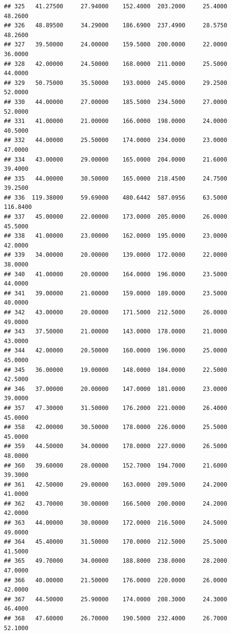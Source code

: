 \documentclass[]{article}
\begin{document}
\begin{verbatim}
## 325   41.27500     27.94000    152.4000  203.2000     25.4000       48.2600
## 326   48.89500     34.29000    186.6900  237.4900     28.5750       48.2600
## 327   39.50000     24.00000    159.5000  200.0000     22.0000       36.0000
## 328   42.00000     24.50000    168.0000  211.0000     25.5000       44.0000
## 329   50.75000     35.50000    193.0000  245.0000     29.2500       52.0000
## 330   44.00000     27.00000    185.5000  234.5000     27.0000       52.0000
## 331   41.00000     21.00000    166.0000  198.0000     24.0000       40.5000
## 332   44.00000     25.50000    174.0000  234.0000     23.0000       47.0000
## 334   43.00000     29.00000    165.0000  204.0000     21.6000       39.4000
## 335   44.00000     30.50000    165.0000  218.4500     24.7500       39.2500
## 336  119.38000     59.69000    480.6442  587.0956     63.5000      116.8400
## 337   45.00000     22.00000    173.0000  205.0000     26.0000       45.5000
## 338   41.00000     23.00000    162.0000  195.0000     23.0000       42.0000
## 339   34.00000     20.00000    139.0000  172.0000     22.0000       38.0000
## 340   41.00000     20.00000    164.0000  196.0000     23.5000       44.0000
## 341   39.00000     21.00000    159.0000  189.0000     23.5000       40.0000
## 342   43.00000     20.00000    171.5000  212.5000     26.0000       49.0000
## 343   37.50000     21.00000    143.0000  178.0000     21.0000       43.0000
## 344   42.00000     20.50000    160.0000  196.0000     25.0000       45.0000
## 345   36.00000     19.00000    148.0000  184.0000     22.5000       42.5000
## 346   37.00000     20.00000    147.0000  181.0000     23.0000       39.0000
## 357   47.30000     31.50000    176.2000  221.0000     26.4000       45.0000
## 358   42.00000     30.50000    178.0000  226.0000     25.5000       45.0000
## 359   44.50000     34.00000    178.0000  227.0000     26.5000       48.0000
## 360   39.60000     28.00000    152.7000  194.7000     21.6000       39.3000
## 361   42.50000     29.00000    163.0000  209.5000     24.2000       41.0000
## 362   43.70000     30.00000    166.5000  200.0000     24.2000       42.0000
## 363   44.00000     30.00000    172.0000  216.5000     24.5000       49.0000
## 364   45.40000     31.50000    170.0000  212.5000     25.5000       41.5000
## 365   49.70000     34.00000    188.8000  238.0000     28.2000       47.0000
## 366   40.00000     21.50000    176.0000  220.0000     26.0000       42.0000
## 367   44.50000     25.90000    174.0000  208.3000     24.3000       46.4000
## 368   47.60000     26.70000    190.5000  232.4000     26.7000       52.1000

\end{verbatim}
\end{document}
